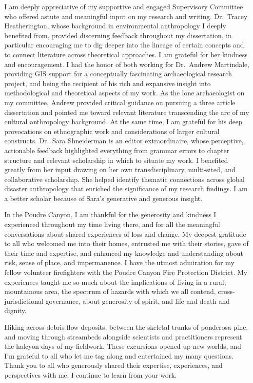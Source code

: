 \documentclass[
]{article}
\begin{document}
I am deeply appreciative of my supportive and engaged Supervisory Committee who offered astute and meaningful input on my research and writing. Dr.~Tracey Heatherington, whose background in environmental anthropology I deeply benefited from, provided discerning feedback throughout my dissertation, in particular encouraging me to dig deeper into the lineage of certain concepts and to connect literature across theoretical approaches. I am grateful for her kindness and encouragement. I had the honor of both working for Dr.~Andrew Martindale, providing GIS support for a conceptually fascinating archaeological research project, and being the recipient of his rich and expansive insight into methodological and theoretical aspects of my work. As the lone archaeologist on my committee, Andrew provided critical guidance on pursuing a three article dissertation and pointed me toward relevant literature transcending the arc of my cultural anthropology background. At the same time, I am grateful for his deep provocations on ethnographic work and considerations of larger cultural constructs. Dr.~Sara Shneiderman is an editor extraordinaire, whose perceptive, actionable feedback highlighted everything from grammar errors to chapter structure and relevant scholarship in which to situate my work. I benefited greatly from her input drawing on her own transdisciplinary, multi-sited, and collaborative scholarship. She helped identify thematic connections across global disaster anthropology that enriched the significance of my research findings. I am a better scholar because of Sara's generative and generous insight.

In the Poudre Canyon, I am thankful for the generosity and kindness I experienced throughout my time living there, and for all the meaningful conversations about shared experiences of loss and change. My deepest gratitude to all who welcomed me into their homes, entrusted me with their stories, gave of their time and expertise, and enhanced my knowledge and understanding about risk, sense of place, and impermanence. I have the utmost admiration for my fellow volunteer firefighters with the Poudre Canyon Fire Protection District. My experiences taught me so much about the implications of living in a rural, mountainous area, the spectrum of hazards with which we all contend, cross-jurisdictional governance, about generosity of spirit, and life and death and dignity.

Hiking across debris flow deposits, between the skeletal trunks of ponderosa pine, and moving through streambeds alongside scientists and practitioners represent the halcyon days of my fieldwork. These excursions opened up new worlds, and I'm grateful to all who let me tag along and entertained my many questions. Thank you to all who generously shared their expertise, experiences, and perspectives with me. I continue to learn from your work.
\end{document}

